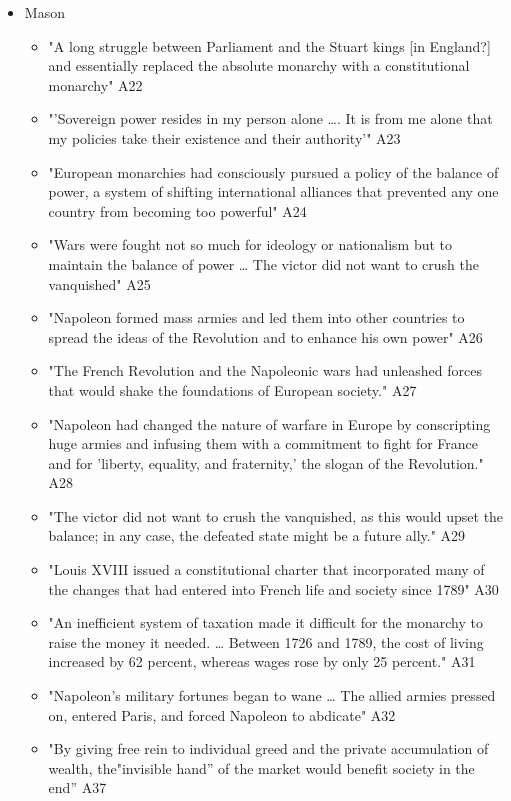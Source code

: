 \documentclass[letterpaper]{article}
\begin{document}
\begin{itemize}
\item Mason

\begin{itemize}
\item "A long struggle between Parliament and the Stuart kings [in
England?] and essentially replaced the absolute monarchy with a
constitutional monarchy" A22
\item "'Sovereign power resides in my person alone \ldots{}. It is from me
alone that my policies take their existence and their authority'"
A23
\item "European monarchies had consciously pursued a policy of the balance
of power, a system of shifting international alliances that
prevented any one country from becoming too powerful" A24
\item "Wars were fought not so much for ideology or nationalism but to
maintain the balance of power \ldots{} The victor did not want to crush
the vanquished" A25
\item "Napoleon formed mass armies and led them into other countries to
spread the ideas of the Revolution and to enhance his own power" A26
\item "The French Revolution and the Napoleonic wars had unleashed forces
that would shake the foundations of European society." A27
\item "Napoleon had changed the nature of warfare in Europe by
conscripting huge armies and infusing them with a commitment to
fight for France and for 'liberty, equality, and fraternity,' the
slogan of the Revolution." A28
\item "The victor did not want to crush the vanquished, as this would
upset the balance; in any case, the defeated state might be a future
ally." A29
\item "Louis XVIII issued a constitutional charter that incorporated many
of the changes that had entered into French life and society since
1789" A30
\item "An inefficient system of taxation made it difficult for the
monarchy to raise the money it needed. \ldots{} Between 1726 and 1789,
the cost of living increased by 62 percent, whereas wages rose by
only 25 percent." A31
\item "Napoleon's military fortunes began to wane \ldots{} The allied armies
pressed on, entered Paris, and forced Napoleon to abdicate" A32
\item "By giving free rein to individual greed and the private
accumulation of wealth, the"invisible hand” of the market would
benefit society in the end” A37
\end{itemize}


\end{itemize}
\end{document}
